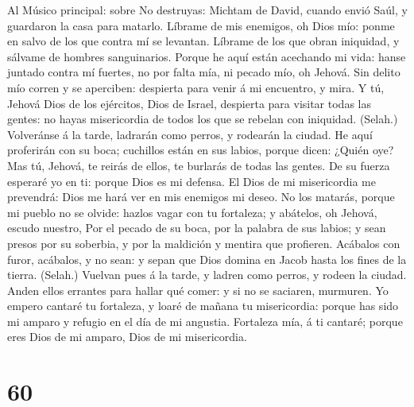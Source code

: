  Al Músico principal: sobre No destruyas: Michtam de
David, cuando envió Saúl, y guardaron la casa para matarlo. Líbrame de
mis enemigos, oh Dios mío: ponme en salvo de los que contra mí se
levantan.  Líbrame de los que obran iniquidad, y sálvame
de hombres sanguinarios.  Porque he aquí están acechando
mi vida: hanse juntado contra mí fuertes, no por falta mía, ni pecado
mío, oh Jehová.  Sin delito mío corren y se aperciben:
despierta para venir á mi encuentro, y mira.  Y tú, Jehová
Dios de los ejércitos, Dios de Israel, despierta para visitar todas las
gentes: no hayas misericordia de todos los que se rebelan con iniquidad.
(Selah.)  Volveránse á la tarde, ladrarán como perros, y
rodearán la ciudad.  He aquí proferirán con su boca;
cuchillos están en sus labios, porque dicen: ¿Quién oye? 
Mas tú, Jehová, te reirás de ellos, te burlarás de todas las gentes.
 De su fuerza esperaré yo en ti: porque Dios es mi
defensa.  El Dios de mi misericordia me prevendrá: Dios
me hará ver en mis enemigos mi deseo.  No los matarás,
porque mi pueblo no se olvide: hazlos vagar con tu fortaleza; y
abátelos, oh Jehová, escudo nuestro,  Por el pecado de su
boca, por la palabra de sus labios; y sean presos por su soberbia, y por
la maldición y mentira que profieren.  Acábalos con
furor, acábalos, y no sean: y sepan que Dios domina en Jacob hasta los
fines de la tierra. (Selah.)  Vuelvan pues á la tarde, y
ladren como perros, y rodeen la ciudad.  Anden ellos
errantes para hallar qué comer: y si no se saciaren, murmuren.
 Yo empero cantaré tu fortaleza, y loaré de mañana tu
misericordia: porque has sido mi amparo y refugio en el día de mi
angustia.  Fortaleza mía, á ti cantaré; porque eres Dios
de mi amparo, Dios de mi misericordia.

\hypertarget{section-59}{%
\section{60}\label{section-59}}


